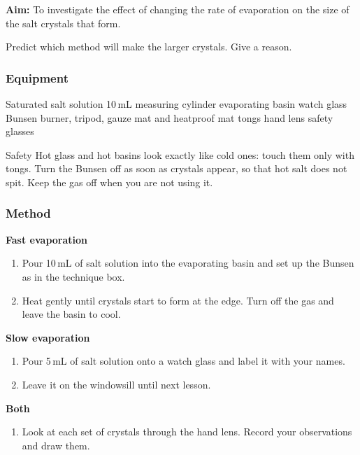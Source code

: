 
\textbf{Aim:} To investigate the effect of changing the rate of evaporation on the size of the salt crystals that form.

\task Predict which method will make the larger crystals. Give a reason. 
\answerbox{4cm}

\subsubsection*{Equipment}
Saturated salt solution \textbullet{} 10\,mL measuring cylinder \textbullet{} evaporating basin \textbullet{} watch glass \textbullet{} Bunsen burner, tripod, gauze mat and heatproof mat \textbullet{} tongs \textbullet{} hand lens \textbullet{} safety glasses

\begin{infobox}{Safety}
Hot glass and hot basins look exactly like cold ones: touch them only with tongs. Turn the Bunsen off as soon as crystals appear, so that hot salt does not spit. Keep the gas off when you are not using it.
\end{infobox}

\subsubsection*{Method}
\textbf{Fast evaporation}
\begin{enumerate}[itemsep=2pt]
  \item Pour 10\,mL of salt solution into the evaporating basin and set up the Bunsen as in the technique box.
  \item Heat gently until crystals start to form at the edge. Turn off the gas and leave the basin to cool.
\end{enumerate}
\textbf{Slow evaporation}
\begin{enumerate}[itemsep=2pt, resume]
  \item Pour 5\,mL of salt solution onto a watch glass and label it with your names.
  \item Leave it on the windowsill until next lesson.
\end{enumerate}
\textbf{Both}
\begin{enumerate}[itemsep=2pt, resume]
  \item Look at each set of crystals through the hand lens. Record your observations and draw them.
\end{enumerate}


